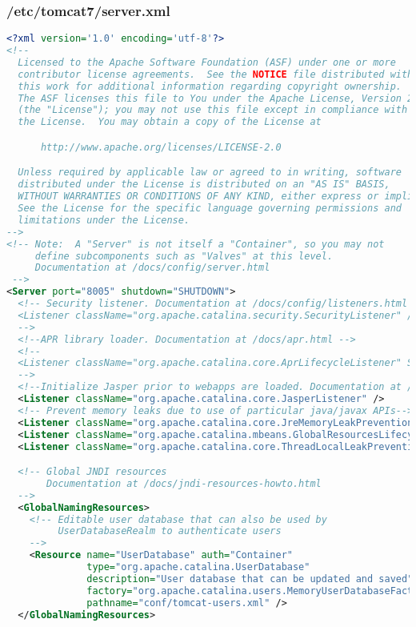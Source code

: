 \subsubsection{/etc/tomcat7/server.xml}
\begin{lstlisting}[language=xml]
<?xml version='1.0' encoding='utf-8'?>
<!--
  Licensed to the Apache Software Foundation (ASF) under one or more
  contributor license agreements.  See the NOTICE file distributed with
  this work for additional information regarding copyright ownership.
  The ASF licenses this file to You under the Apache License, Version 2.0
  (the "License"); you may not use this file except in compliance with
  the License.  You may obtain a copy of the License at

      http://www.apache.org/licenses/LICENSE-2.0

  Unless required by applicable law or agreed to in writing, software
  distributed under the License is distributed on an "AS IS" BASIS,
  WITHOUT WARRANTIES OR CONDITIONS OF ANY KIND, either express or implied.
  See the License for the specific language governing permissions and
  limitations under the License.
-->
<!-- Note:  A "Server" is not itself a "Container", so you may not
     define subcomponents such as "Valves" at this level.
     Documentation at /docs/config/server.html
 -->
<Server port="8005" shutdown="SHUTDOWN">
  <!-- Security listener. Documentation at /docs/config/listeners.html
  <Listener className="org.apache.catalina.security.SecurityListener" />
  -->
  <!--APR library loader. Documentation at /docs/apr.html -->
  <!--
  <Listener className="org.apache.catalina.core.AprLifecycleListener" SSLEngine="on" />
  -->
  <!--Initialize Jasper prior to webapps are loaded. Documentation at /docs/jasper-howto.html -->
  <Listener className="org.apache.catalina.core.JasperListener" />
  <!-- Prevent memory leaks due to use of particular java/javax APIs-->
  <Listener className="org.apache.catalina.core.JreMemoryLeakPreventionListener" />
  <Listener className="org.apache.catalina.mbeans.GlobalResourcesLifecycleListener" />
  <Listener className="org.apache.catalina.core.ThreadLocalLeakPreventionListener" />

  <!-- Global JNDI resources
       Documentation at /docs/jndi-resources-howto.html
  -->
  <GlobalNamingResources>
    <!-- Editable user database that can also be used by
         UserDatabaseRealm to authenticate users
    -->
    <Resource name="UserDatabase" auth="Container"
              type="org.apache.catalina.UserDatabase"
              description="User database that can be updated and saved"
              factory="org.apache.catalina.users.MemoryUserDatabaseFactory"
              pathname="conf/tomcat-users.xml" />
  </GlobalNamingResources>


\end{lstlisting}
